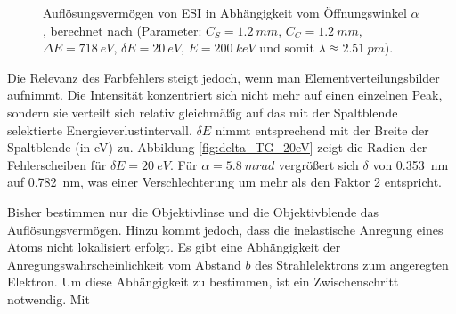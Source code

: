 \documentclass[
	paper=a4,				%
	twoside=true,			%
	BCOR=6mm,				%
	fontsize=12pt,			%
	pagesize=auto,			%
	numbers=noenddot,		%
	bibliography=totoc,		%
	draft=false
]{scrartcl}
\begin{document}
\begin{figure}
	\centering
	\caption{Auflösungsvermögen von ESI in Abhängigkeit vom Öffnungswinkel $\alpha$, berechnet nach \cite{thomas_introduction_2002} (Parameter: $C_S = \SI{1,2}{mm}$, $C_C = \SI{1,2}{mm}$, $\Delta E = \SI{718}{eV}$, $\delta E=\SI{20}{eV}$, $E=\SI{200}{keV}$ und somit $\lambda\approxeq \SI{2,51}{pm}$).}
\end{figure}

Die Relevanz des Farbfehlers steigt jedoch, wenn man Elementverteilungsbilder aufnimmt. Die Intensität konzentriert sich nicht mehr auf einen einzelnen Peak, sondern sie verteilt sich relativ gleichmäßig auf das mit der Spaltblende selektierte Energieverlustintervall. $\delta E$ nimmt entsprechend mit der Breite der Spaltblende (in \si{eV}) zu. Abbildung \ref{fig:delta_TG_20eV} zeigt die Radien der Fehlerscheiben für $\delta E=\SI{20}{eV}$. Für $\alpha=\SI{5,8}{mrad}$ vergrößert sich $\delta$ von \SI{0,353}{nm} auf \SI{0,782}{nm}, was einer Verschlechterung um mehr als den Faktor 2 entspricht.

Bisher bestimmen nur die Objektivlinse und die Objektivblende das Auflösungsvermögen. Hinzu kommt jedoch, dass die inelastische Anregung eines Atoms nicht lokalisiert erfolgt. Es gibt eine Abhängigkeit der Anregungswahrscheinlichkeit vom Abstand $b$ des Strahlelektrons zum angeregten Elektron. Um diese Abhängigkeit zu bestimmen, ist ein Zwischenschritt notwendig. Mit
\end{document}
